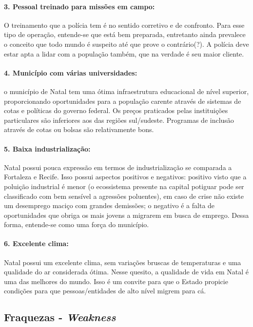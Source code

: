 \documentclass[
	12pt,				%
	openright,			%
	twoside,			%
	a4paper,			%
	chapter=TITLE,		%
	section=TITLE,		%
	subsection=TITLE,	%
	subsubsection=TITLE,%
	spanish,            %
	english,			%
	brazil				%
	]{abntex2}
\begin{document}
\paragraph*{\textbf{3. Pessoal treinado para missões em campo:}} O treinamento que a polícia tem é no sentido corretivo e de confronto. Para esse tipo de operação, entende-se que está bem preparada, entretanto ainda prevalece o conceito que todo mundo é suspeito até que prove o contrário(?). A polícia deve estar apta a lidar com a população também, que na verdade é seu maior cliente.
\hypertarget{S4}{}
\paragraph*{\textbf{4. Município com várias universidades:}} o município de Natal tem uma ótima infraestrutura educacional de nível superior, proporcionando oportunidades para a população carente através de sistemas de cotas e políticas do governo federal. Os preços praticados pelas instituições particulares são inferiores aos das regiões sul/sudeste. Programas de inclusão através de cotas ou bolsas são relativamente bons.
\hypertarget{S5}{}
\paragraph*{\textbf{5. Baixa industrialização:}} Natal possui pouca expressão em termos de industrialização se comparada a Fortaleza e Recife. Isso possui aspectos positivos e negativos: positivo visto que a poluição industrial é menor (o ecossistema presente na capital potiguar pode ser classificado com bem sensível a agressões poluentes), em caso de crise não existe um desemprego maciço com grandes demissões; o negativo é a falta de oportunidades que obriga os mais jovens a migrarem em busca de emprego. Dessa forma, entende-se como uma força do município.
\hypertarget{S6}{}
\paragraph*{\textbf{6. Excelente clima:}} Natal possui um excelente clima, sem variações bruscas de temperaturas e uma qualidade do ar considerada ótima. Nesse quesito, a qualidade de vida em Natal é uma das melhores do mundo. Isso é um convite para que o Estado propicie condições para que
pessoas/entidades de alto nível migrem para cá.\\

\subsection{Fraquezas - \textit{Weakness}}
\hypertarget{W1}{}
\end{document}
